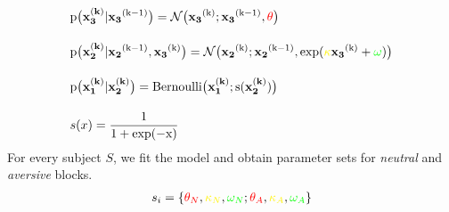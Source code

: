 \documentclass{article}
\begin{document}
\begin{align*}
&\rm p\big(\mathbf{x_{3}^{(k)}}|\mathbf{x_{3}}^{(k-1)}\big) = \mathcal{N}\big(\mathbf{x_{3}}^{(k)};\mathbf{x_{3}}^{(k-1)},\textcolor{red}\theta\big) \\[1em]
&\rm p\big(\mathbf{x_{2}^{(k)}}|\mathbf{x_{2}}^{(k-1)},\mathbf{x_{3}}^{(k)}\big) = \mathcal{N}\big(\mathbf{x_{2}}^{(k)};\mathbf{x_{2}}^{(k-1)},\rm exp(\textcolor{yellow}\kappa\mathbf{x_{3}}^{(k)}+\textcolor{green}\omega)\big) \\[1em] 
&\rm p\big(\mathbf{x_{1}^{(k)}}|\mathbf{x_{2}^{(k)}}\big) = \rm Bernoulli\big(\mathbf{x_{1}^{(k)}};s(\mathbf{x_{2}^{(k)}})\big)\\[1em]
&s(x) = \frac{1}{1+\rm exp(-x)}
\end{align*}
For every subject $S$, we fit the model and obtain parameter sets for \textit{neutral} and \textit{aversive} blocks.
\begin{align*}
s_{i} = \{\textcolor{red}{\theta_{N}} ,\textcolor{yellow}{\kappa_{N}} , \textcolor{green}{\omega_{N}};\textcolor{red}{\theta_{A}} ,\textcolor{yellow}{\kappa_{A}} , \textcolor{green}{\omega_{A}}\}
\end{align*}
\end{document}

